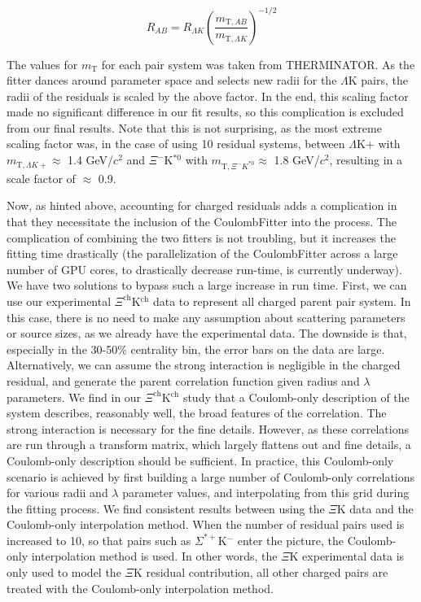 \documentclass[../AnalysisNoteJBuxton.tex]{subfiles}
\begin{document}
\begin{equation}
R_{AB} = R_{\Lambda K}\left(\frac{m_{\mathrm{T},AB}}{m_{\mathrm{T},\Lambda K}}\right)^{-1/2}
\end{equation}

The values for $m_{\mathrm{T}}$ for each pair system was taken from THERMINATOR.  As the fitter dances around parameter space and selects new radii for the $\Lambda$K pairs, the radii of the residuals is scaled by the above factor.  In the end, this scaling factor made no significant difference in our fit results, so this complication is excluded from our final results.  Note that this is not surprising, as the most extreme scaling factor was, in the case of using 10 residual systems, between $\Lambda$K+ with $m_{\mathrm{T},\Lambda K+} \approx$ 1.4 GeV/$c^{2}$ and $\Xi^{-}$K$^{*0}$ with $m_{\mathrm{T},\Xi^{-} K^{*0}} \approx$ 1.8 GeV/$c^{2}$, resulting in a scale factor of $\approx$ 0.9.

Now, as hinted above, accounting for charged residuals adds a complication in that they necessitate the inclusion of the CoulombFitter into the process.  The complication of combining the two fitters is not troubling, but it increases the fitting time drastically (the parallelization of the CoulombFitter across a large number of GPU cores, to drastically decrease run-time, is currently underway).  We have two solutions to bypass such a large increase in run time.  First, we can use our experimental $\Xi^{\mathrm{ch}}$K$^{\mathrm{ch}}$ data to represent all charged parent pair system.  In this case, there is no need to make any assumption about scattering parameters or source sizes, as we already have the experimental data.  The downside is that, especially in the 30-50\% centrality bin, the error bars on the data are large.  Alternatively, we can assume the strong interaction is negligible in the charged residual, and generate the parent correlation function given radius and $\lambda$ parameters.  We find in our $\Xi^{\mathrm{ch}}$K$^{\mathrm{ch}}$ study that a Coulomb-only description of the system describes, reasonably well, the broad features of the correlation.  The strong interaction is necessary for the fine details.  However, as these correlations are run through a transform matrix, which largely flattens out and fine details, a Coulomb-only description should be sufficient.  In practice, this Coulomb-only scenario is achieved by first building a large number of Coulomb-only correlations for various radii and $\lambda$ parameter values, and interpolating from this grid during the fitting process.  We find consistent results between using the $\Xi$K data and the Coulomb-only interpolation method.  When the number of residual pairs used is increased to 10, so that pairs such as $\Sigma^{*+}$K$^{-}$ enter the picture, the Coulomb-only interpolation method is used.  In other words, the $\Xi$K experimental data is only used to model the $\Xi$K residual contribution, all other charged pairs are treated with the Coulomb-only interpolation method.
\end{document}
